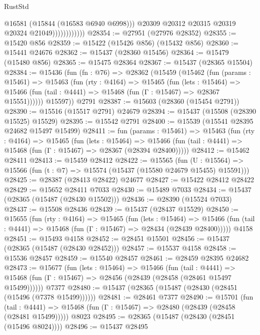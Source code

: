 \begin{lexlean}{RustStd}
\begin{coremodule}
                              @16581
                              (@15844 (@16583 @6940 @6998)))
                            @20309
                            @20312
                            @20315
                            @20319
                            @20324
                            @21049))))))))))))
@28354 := @27951 (@27976 @28352)
@28355 := @15420 @856
@28359 := @15422 (@15426 @856) (@15432 @856)
@28360 := @15441 @24676
@28362 := @15437 (@28360 @15456)
@28364 := @15479 (@15480 @856)
@28365 := @15475 @28364
@28367 := @15437 (@28365 @15504)
@28384 := @15436
    (fun (fn : @76) =>
    @28362
      (@15459
        (@15462
          (fun (params : @15461) =>
          @15463
            (fun (rty : @4164) =>
            @15465
              (fun (lets : @15464) =>
              @15466 (fun (tail : @4441) => @15468 (fun (Γ : @15467) => @28367 @15551))))))
        @15597))
    @2791
@28387 := @15603 (@28360 (@15454 @2791))
@28390 := @15516 (@15517 @2791) @24679
@28394 := @15437 (@15508 (@28390 @15525) @15529)
@28395 := @15542 @2791
@28400 := @15539 (@15541 @28395 @24682 @15497 @15499)
@28411 := fun (params : @15461) =>
  @15463
    (fun (rty : @4164) =>
    @15465
      (fun (lets : @15464) =>
      @15466 (fun (tail : @4441) => @15468 (fun (Γ : @15467) => @28367 (@28394 @28400)))))
@28412 := @15462 @28411
@28413 := @15459 @28412
@28422 := @15565
    (fun (U : @15564) => @15566 (fun (t : @7) => @15574 (@15437 (@15580 @24679 @15455) @15591)))
@28425 := @28387 (@28413 @28422) @24677
@28427 := @15422 @28412 @28422
@28429 := @15652 @28411 @7033
@28430 := @15489 @7033
@28434 := @15437 (@28365 (@15487 (@28430 @15502)))
@28436 := @28390 (@15524 @7033)
@28437 := @15508 @28436
@28439 := @15437 (@28437 @15529)
@28450 := @15655
    (fun (rty : @4164) =>
    @15465
      (fun (lets : @15464) =>
      @15466 (fun (tail : @4441) => @15468 (fun (Γ : @15467) => @28434 (@28439 @28400)))))
    @4158
@28451 := @15493 @4158
@28452 := @28451 @15501
@28456 := @15437 (@28365 (@15487 (@28430 @28452)))
@28457 := @15537 @4158
@28458 := @15536 @28457
@28459 := @15540 @28457
@28461 := @28459 @28395 @24682
@28473 := @15677
    (fun (lets : @15464) =>
    @15466
      (fun (tail : @4441) =>
      @15468 (fun (Γ : @15467) => @28456 (@28439 (@28458 (@28461 @15497 @15499))))))
    @7377
@28480 := @15437 (@28365 (@15487 (@28430 (@28451 (@15496 (@7378 @15499))))))
@28481 := @28461 @7377
@28490 := @15701
    (fun (tail : @4441) => @15468 (fun (Γ : @15467) => @28480 (@28439 (@28458 (@28481 @15499)))))
    @8023
@28495 := @28365 (@15487 (@28430 (@28451 (@15496 @8024))))
@28496 := @15437 @28495

\end{coremodule}
\end{lexlean}
